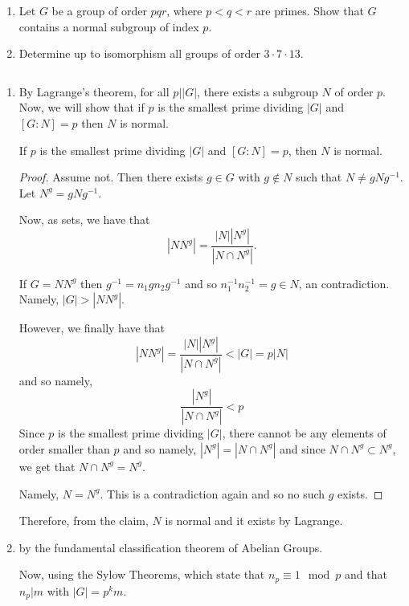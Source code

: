 \documentclass[12pt]{Qual}
\begin{document}
\begin{problem} $\,$
\begin{enumerate}[label=(\alph*)]
    \item Let $G$ be a group of order $pqr$, where $p<q<r$ are primes. Show that $G$ contains a normal subgroup of index $p.$
    \item Determine up to isomorphism all groups of order $3\cdot7\cdot 13$.
\end{enumerate}
\end{problem}


\begin{solution}$\,$
\begin{enumerate}[label=(\alph*)]
    \item By Lagrange's theorem, for all $p||G|$, there exists a subgroup $N$ of order $p.$ Now, we will show that if $p$ is the smallest prime dividing $|G|$ and $[G:N]=p$ then $N$ is normal.

    \begin{claim} If $p$ is the smallest prime dividing $|G|$ and $[G:N]=p$, then $N$ is normal.
    \begin{proof} Assume not. Then there exists $g\in G$ with $g\notin N$ such that $N\not=gNg^{-1}$. Let $N^g=gNg^{-1}$.

    Now, as sets, we have that $$|NN^g|=\frac{|N||N^g|}{|N\cap N^g|}.$$

    If $G=NN^g$ then $g^{-1}=n_1gn_2g^{-1}$ and so $n_1^{-1}n_2^{-1}=g\in N$, an contradiction. Namely, $|G|>|NN^g|$.

    However, we finally have that $$|NN^g|=\frac{|N||N^g|}{|N\cap N^g|}<|G|=p|N|$$ and so namely, $$\frac{|N^g|}{|N\cap N^g|}<p$$ Since $p$ is the smallest prime dividing $|G|$, there cannot be any elements of order smaller than $p$ and so namely, $|N^g|=|N\cap N^g|$ and since $N\cap N^g\subset N^g$, we get that $N\cap N^g=N^g$.

    Namely, $N=N^g$. This is a contradiction again and so no such $g$ exists.
    \end{proof}
    \end{claim}

    Therefore, from the claim, $N$ is normal and it exists by Lagrange.

    \item {} by the fundamental classification theorem of Abelian Groups.

    Now, using the Sylow Theorems, which state that $n_p\equiv 1\mod p$ and that $n_p|m$ with $|G|=p^km$.


\end{enumerate}
\end{solution}
\end{document}

